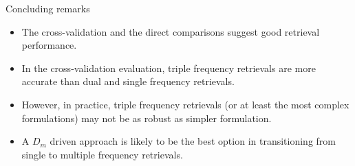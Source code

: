 \documentclass[final,t]{beamer}
\begin{document}
\begin{frame}
\begin{columns}[]
\begin{column}{.32\linewidth}
\begin{table}[]
 
 \end{table}
  
  \begin{block}{Concluding remarks}
   \begin{itemize}
   \item
   The cross-validation and the direct comparisons suggest good retrieval performance.
   \item
   In the cross-validation evaluation, triple frequency retrievals are more accurate than dual and single frequency retrievals.
   \item
   However, in practice, triple frequency retrievals (or at least the most complex formulations) may not be as robust as simpler formulation.
   \item 
   A $D_m$ driven approach is likely to be the best option in transitioning from  single to multiple 
   frequency retrievals.
   \end{itemize}
 \end{block}
 
  \end{column}
  
 
  \end{columns}

\end{frame}
\end{document}
